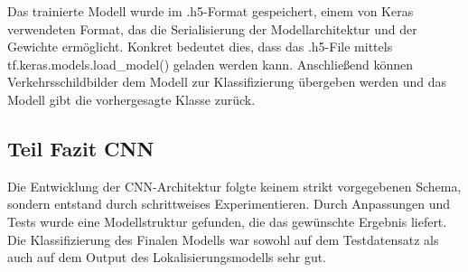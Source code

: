 \documentclass[runningheads]{llncs}
\begin{document}
Das trainierte Modell wurde im .h5-Format gespeichert, einem von Keras verwendeten Format, das die Serialisierung der
Modellarchitektur und der Gewichte ermöglicht. Konkret bedeutet dies, dass das .h5-File mittels tf.keras.models.load\_model()
geladen werden kann. Anschließend können Verkehrsschildbilder dem Modell zur Klassifizierung übergeben werden und das Modell
gibt die vorhergesagte Klasse zurück.

\subsection{Teil Fazit CNN}
Die Entwicklung der CNN-Architektur folgte keinem strikt vorgegebenen Schema, sondern entstand durch schrittweises Experimentieren.
Durch Anpassungen und Tests wurde eine Modellstruktur gefunden, die das gewünschte Ergebnis liefert. Die Klassifizierung des
Finalen Modells war sowohl auf dem Testdatensatz als auch auf dem Output des Lokalisierungsmodells sehr gut.





\end{document}

